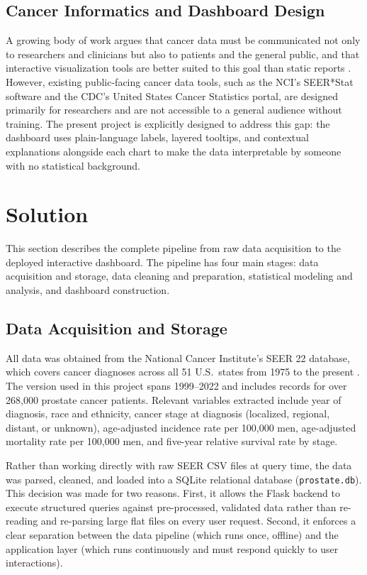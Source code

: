\documentclass[12pt]{article}
\begin{document}
\subsection{Cancer Informatics and Dashboard Design}

A growing body of work argues that cancer data must be communicated not only to
researchers and clinicians but also to patients and the general public, and that
interactive visualization tools are better suited to this goal than static reports
\cite{siegel2023}. However, existing public-facing cancer data tools, such as the
NCI's SEER*Stat software and the CDC's United States Cancer Statistics portal, are
designed primarily for researchers and are not accessible to a general audience
without training. The present project is explicitly designed to address this gap:
the dashboard uses plain-language labels, layered tooltips, and contextual
explanations alongside each chart to make the data interpretable by someone with no
statistical background.

\section{Solution}

This section describes the complete pipeline from raw data acquisition to the
deployed interactive dashboard. The pipeline has four main stages: data acquisition
and storage, data cleaning and preparation, statistical modeling and analysis, and
dashboard construction.

\subsection{Data Acquisition and Storage}

All data was obtained from the National Cancer Institute's SEER 22 database, which
covers cancer diagnoses across all 51 U.S.\ states from 1975 to the present
\cite{seer2024}. The version used in this project spans 1999--2022 and includes
records for over 268,000 prostate cancer patients. Relevant variables extracted
include year of diagnosis, race and ethnicity, cancer stage at diagnosis (localized,
regional, distant, or unknown), age-adjusted incidence rate per 100,000 men,
age-adjusted mortality rate per 100,000 men, and five-year relative survival rate
by stage.

Rather than working directly with raw SEER CSV files at query time, the data was
parsed, cleaned, and loaded into a SQLite relational database (\texttt{prostate.db}).
This decision was made for two reasons. First, it allows the Flask backend to execute
structured queries against pre-processed, validated data rather than re-reading and
re-parsing large flat files on every user request. Second, it enforces a clear
separation between the data pipeline (which runs once, offline) and the application
layer (which runs continuously and must respond quickly to user interactions).
\end{document}
